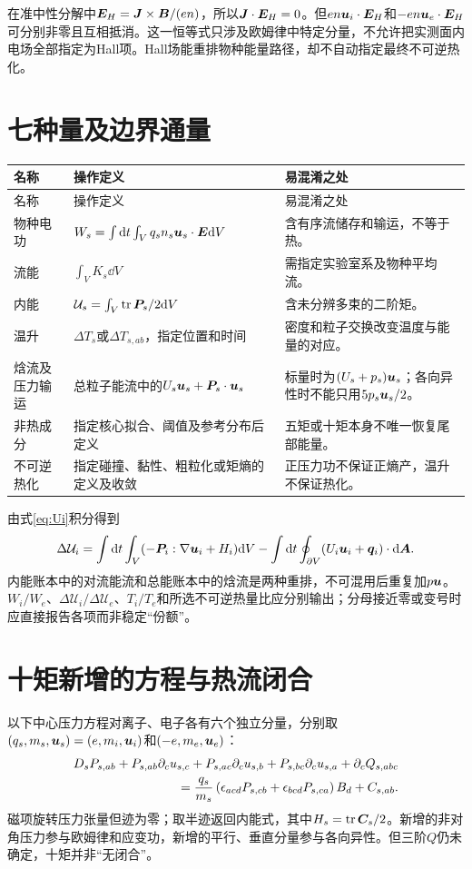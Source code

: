 在准中性分解中$\bm{E}_H=\bm{J}\times\bm{B}/(en)$，所以$\bm{J}\cdot\bm{E}_H=0$。但$en\bm{u}_i\cdot\bm{E}_H$和$-en\bm{u}_e\cdot\bm{E}_H$可分别非零且互相抵消。这一恒等式只涉及欧姆律中特定分量，不允许把实测面内电场全部指定为Hall项。Hall场能重排物种能量路径，却不自动指定最终不可逆热化。

\section{七种量及边界通量}
\begin{longtable}{P{27mm}P{66mm}P{55mm}}
\toprule 名称 & 操作定义 & 易混淆之处\\\midrule\endfirsthead
\toprule 名称 & 操作定义 & 易混淆之处\\\midrule\endhead
物种电功 & $W_s=\int\mathrm d t\int_Vq_sn_s\bm{u}_s\cdot\bm{E}\mathrm d V$ & 含有序流储存和输运，不等于热。\\
流能 & $\int_VK_s\dd V$ & 需指定实验室系及物种平均流。\\
内能 & $\mathcal U_s=\int_V\operatorname{tr}\bm{P}_s/2\mathrm d V$ & 含未分辨多束的二阶矩。\\
温升 & $\Delta T_s$或$\Delta T_{s,ab}$，指定位置和时间 & 密度和粒子交换改变温度与能量的对应。\\
焓流及压力输运 & 总粒子能流中的$U_s\bm{u}_s+\bm{P}_s\cdot\bm{u}_s$ & 标量时为$(U_s+p_s)\bm{u}_s$；各向异性时不能只用$5p_s\bm{u}_s/2$。\\
非热成分 & 指定核心拟合、阈值及参考分布后定义 & 五矩或十矩本身不唯一恢复尾部能量。\\
不可逆热化 & 指定碰撞、黏性、粗粒化或矩熵的定义及收敛 & 正压力功不保证正熵产，温升不保证热化。\\
\bottomrule\end{longtable}

由式\eqref{eq:Ui}积分得到
\begin{equation}
\Delta\mathcal U_i=\int\mathrm d t\int_V(-\bm{P}_i:\nabla\bm{u}_i+H_i)\mathrm d V
-\int\mathrm d t\oint_{\partial V}(U_i\bm{u}_i+\bm{q}_i)\cdot\mathrm d\bm{A}.
\end{equation}
内能账本中的对流能流和总能账本中的焓流是两种重排，不可混用后重复加$p\bm{u}$。$W_i/W_e$、$\Delta\mathcal U_i/\Delta\mathcal U_e$、$T_i/T_e$和所选不可逆热量比应分别输出；分母接近零或变号时应直接报告各项而非稳定“份额”。

\section{十矩新增的方程与热流闭合}
以下中心压力方程对离子、电子各有六个独立分量，分别取$(q_s,m_s,\bm{u}_s)=(e,m_i,\bm{u}_i)$和$(-e,m_e,\bm{u}_e)$：
\begin{align}
D_sP_{s,ab}+P_{s,ab}\partial_cu_{s,c}
+P_{s,ac}\partial_cu_{s,b}+P_{s,bc}\partial_cu_{s,a}
+\partial_cQ_{s,abc}\notag\\
=\frac{q_s}{m_s}\left(\epsilon_{acd}P_{s,cb}+\epsilon_{bcd}P_{s,ca}\right)B_d+C_{s,ab}.
\end{align}
磁项旋转压力张量但迹为零；取半迹返回内能式，其中$H_s=\operatorname{tr}\bm{C}_s/2$。新增的非对角压力参与欧姆律和应变功，新增的平行、垂直分量参与各向异性。但三阶$Q$仍未确定，十矩并非“无闭合”。

